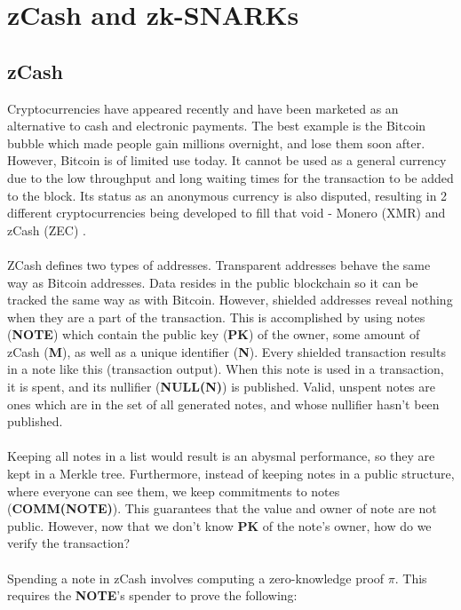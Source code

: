 
\chapter{zCash and zk-SNARKs} %

\label{Chapter3} %


\section{zCash}

Cryptocurrencies have appeared recently and have been marketed as an alternative to cash and electronic payments. The best example is the Bitcoin bubble which made people gain millions overnight, and lose them soon after. However, Bitcoin is of limited use today. It cannot be used as a general currency due to the low throughput and long waiting times for the transaction to be added to the block. Its status as an anonymous currency is also disputed, resulting in 2 different cryptocurrencies being developed to fill that void - Monero (XMR) \cite{monero} and zCash (ZEC) \cite{zcashmain}.\\
\\
ZCash defines two types of addresses. Transparent addresses behave the same way as Bitcoin addresses. Data resides in the public blockchain so it can be tracked the same way as with Bitcoin. However, shielded addresses reveal nothing when they are a part of the transaction. This is accomplished by using notes (\textbf{NOTE}) which contain the public key (\textbf{PK}) of the owner, some amount of zCash (\textbf{M}), as well as a unique identifier (\textbf{N}). Every shielded transaction results in a note like this (transaction output). When this note is used in a transaction, it is spent, and its nullifier (\textbf{NULL(N)}) is published. Valid, unspent notes are ones which are in the set of all generated notes, and whose nullifier hasn't been published.\\
\\
Keeping all notes in a list would result is an abysmal performance, so they are kept in a Merkle tree. Furthermore, instead of keeping notes in a public structure, where everyone can see them, we keep commitments to notes (\textbf{COMM(NOTE)}). This guarantees that the value and owner of note are not public. However, now that we don't know \textbf{PK} of the note's owner, how do we verify the transaction?\\
\\
Spending a note in zCash involves computing a zero-knowledge proof $\pi$. This requires the \textbf{NOTE}'s spender to prove the following:

